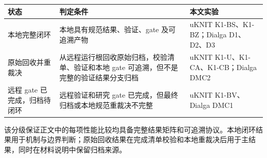 \documentclass[
  a4paper,
  UTF8]{ctexart}
\begin{document}
\begin{longtable}[]{@{}lll@{}}
\toprule
\begin{minipage}[b]{0.30\columnwidth}\raggedright
状态\strut
\end{minipage} & \begin{minipage}[b]{0.30\columnwidth}\raggedright
判定条件\strut
\end{minipage} & \begin{minipage}[b]{0.30\columnwidth}\raggedright
本文实验\strut
\end{minipage}\tabularnewline
\midrule
\endhead
\begin{minipage}[t]{0.30\columnwidth}\raggedright
本地完整闭环\strut
\end{minipage} & \begin{minipage}[t]{0.30\columnwidth}\raggedright
本地具有规范结果、验证、gate 及可追溯产物\strut
\end{minipage} & \begin{minipage}[t]{0.30\columnwidth}\raggedright
uKNIT K1-BS、K1-BZ；Dialga D1、D2、D3\strut
\end{minipage}\tabularnewline
\begin{minipage}[t]{0.30\columnwidth}\raggedright
原始回收并重裁决\strut
\end{minipage} & \begin{minipage}[t]{0.30\columnwidth}\raggedright
从远程运行根回收原始归档，校验清单、验证和本地 gate
可追溯，但不是完整的验证结果分支归档\strut
\end{minipage} & \begin{minipage}[t]{0.30\columnwidth}\raggedright
uKNIT K1-U、K1-CA、K1-CB；Dialga DMC2\strut
\end{minipage}\tabularnewline
\begin{minipage}[t]{0.30\columnwidth}\raggedright
远程 gate 已完成，归档待闭环\strut
\end{minipage} & \begin{minipage}[t]{0.30\columnwidth}\raggedright
远程验证和研究 gate 已完成，但最终归档或本地规范重裁决不完整\strut
\end{minipage} & \begin{minipage}[t]{0.30\columnwidth}\raggedright
uKNIT K1-BV、Dialga DMC1\strut
\end{minipage}\tabularnewline
\bottomrule
\end{longtable}

该分级保证正文中的每项性能比较均具备完整结果矩阵和可追溯协议。本地闭环结果用于机制与边界判断；原始回收结果在完成清单校验和本地重裁决后用于主结果，同时在材料说明中保留归档来源。
\end{document}
